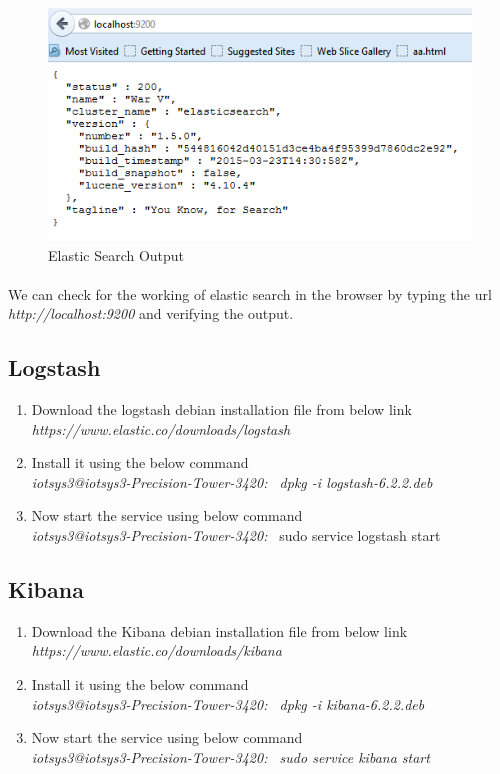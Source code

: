 \documentclass{report}
\begin{document}
\begin{figure}[H]
\centering
\caption{Elastic Search Output}
\includegraphics[scale=0.7]{Elastic_Search_Installation}
\end{figure}

\paragraph{}
We can check for the working of elastic search in the browser by typing the url \textit{http://localhost:9200} and verifying the output.

\subsection{Logstash}

\begin{enumerate}
\item Download the logstash debian installation file from below link\\
\textit{https://www.elastic.co/downloads/logstash}
\item Install it using the below command \\
\textit {{\color{blue}iotsys3@iotsys3-Precision-Tower-3420:~} dpkg -i logstash-6.2.2.deb}
\item Now start the service using below command\\
\textit{\color{blue}iotsys3@iotsys3-Precision-Tower-3420:~} sudo service logstash start
\end{enumerate}

\subsection{Kibana}

\begin{enumerate}
\item Download the Kibana debian installation file from below link\\
\textit{https://www.elastic.co/downloads/kibana}
\item Install it using the below command\\
\textit{{\color{blue}iotsys3@iotsys3-Precision-Tower-3420:~} dpkg -i kibana-6.2.2.deb}
\item Now start the service using below command\\
\textit{{\color{blue}iotsys3@iotsys3-Precision-Tower-3420:~} sudo service kibana start}
\end{enumerate}
\end{document}
